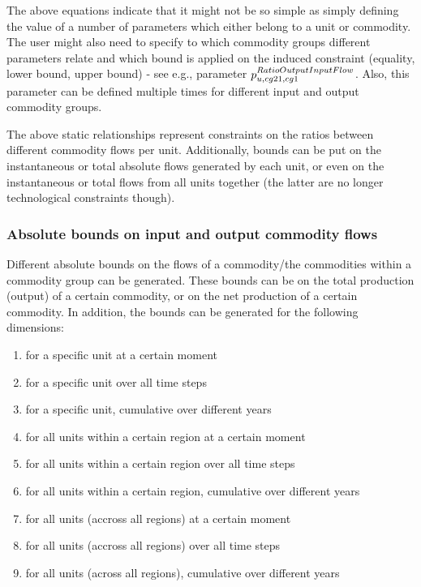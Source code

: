 {\color{red}
The above equations indicate that it might not be so simple as simply defining the value of a number of parameters which either belong to a unit or commodity. The user might also need to specify to which commodity groups different parameters relate and which bound is applied on the induced constraint (equality, lower bound, upper bound) - see e.g., parameter $p^{RatioOutputInputFlow}_{u,cg21,cg1}$. Also, this parameter can be defined multiple times for different input and output commodity groups.
}


The above static relationships represent constraints on the ratios between different commodity flows per unit. Additionally, bounds can be put on the instantaneous or total absolute flows generated by each unit, or even on the instantaneous or total flows from all units together (the latter are no longer technological constraints though).

\subsubsection{Absolute bounds on input and output commodity flows}

Different absolute bounds on the flows of a commodity/the commodities within a commodity group can be generated. These bounds can be on the total production (output) of a certain commodity, or on the net production of a certain commodity. In addition, the bounds can be generated for the following dimensions:
\begin{enumerate}
	\item for a specific unit at a certain moment
	\item for a specific unit over all time steps
	\item for a specific unit, cumulative over different years
	\item for all units within a certain region at a certain moment
	\item for all units within a certain region over all time steps
	\item for all units within a certain region, cumulative over different years
	\item for all units (accross all regions) at a certain moment
	\item for all units (accross all regions) over all time steps
	\item for all units (across all regions), cumulative over different years
\end{enumerate}

